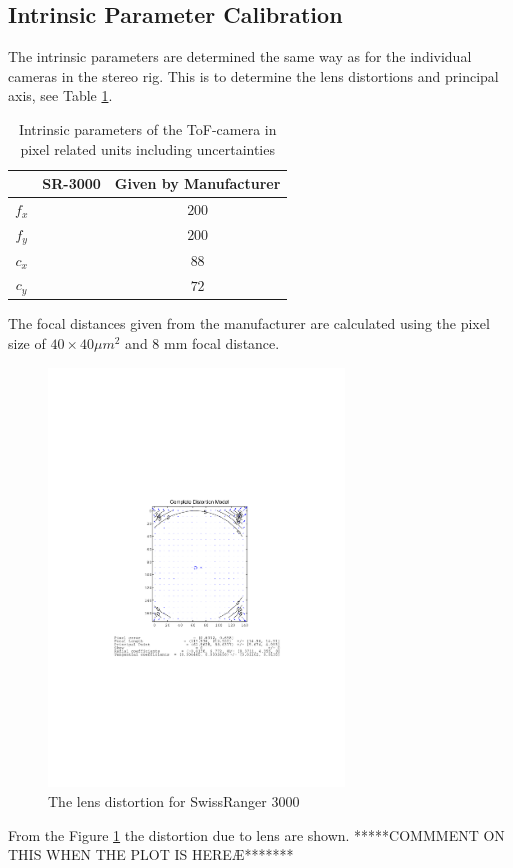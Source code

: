 \subsection{Intrinsic Parameter Calibration}
The intrinsic parameters are determined the same way as for the individual cameras in the
stereo rig. This is to determine the lens distortions and principal axis, see Table
\ref{chap3:tab-intrinsic-sr3000}.
\begin{table}[htbp]
  \centering
    \begin{tabular}{|c|c|c|} 
        \hline
                & SR-3000       & Given by Manufacturer \\
        \hline
        $f_x$   & $ $  & $200$  \\
        $f_y$   & $ $  & $200$  \\
        \hline
        $c_x$   & $ $  & $88$ \\
        $c_y$   & $ $ & $72$  \\
        \hline
    \end{tabular}
    \caption{Intrinsic parameters of the ToF-camera in pixel related units including
    uncertainties}
    \label{chap3:tab-intrinsic-sr3000}
\end{table}
The focal distances given from the manufacturer are calculated using the pixel size of
$40 \times 40 \mu m^2$ and 8 mm focal distance.

\begin{figure}[htbp]
    \centering
    \includegraphics[width=0.7\textwidth]{pics/sr3000_comp_dist}
    \caption{The lens distortion for SwissRanger 3000}
    \label{chap3:fig-sr3000-comp-lensdist}
\end{figure}
From the Figure \ref{chap3:fig-sr3000-comp-lensdist} the distortion due to lens are shown.
*****COMMMENT ON THIS WHEN THE PLOT IS HEREÆ*******


